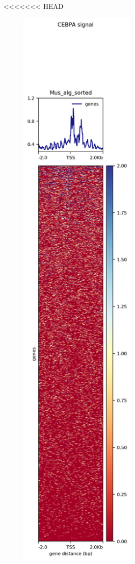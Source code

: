 \documentclass[
]{article}
\begin{document}
<<<<<<< HEAD
\begin{center}\includegraphics[width=300px]{./T04_images/CEBPA_genes2} \end{center}
\end{document}
